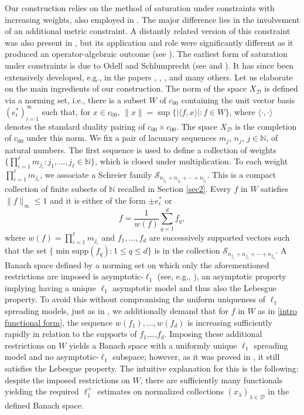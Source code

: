 \documentclass[12pt,a4paper]{amsart}
\newcommand{\N}{\mathbb{N}}
\theoremstyle{definition}
\theoremstyle{plain}
\begin{document}
Our construction relies on the method of saturation under constraints with increasing weights, also employed in \cite{argyros:motakis:2020}. The major difference lies in the involvement of an additional metric constraint. A distantly related version of this constraint was also present in \cite{motakis:2024}, but its application and role were significantly different as it produced an operator-algebraic outcome (see \cite[Section 2]{motakis:2024}). The earliest form of saturation under constraints is due to Odell and Schlumprecht (see \cite{odell:schlumprecht:1995} and \cite{odell:schlumprecht:2000}). It has since been extensively developed, e.g., in the papers \cite{argyros:motakis:2014}, \cite{beanland:freeman:motakis:2015}, \cite{argyros:motakis:2020}, and many others. Let us elaborate on the main ingredients of our construction. The norm of the space $X_\mathcal{D}$ is defined via a norming set, i.e., there is a subset $W$ of $c_{00}$ containing the unit vector basis $(e_i^*)_{i=1}^\infty$ such that, for $x\in c_{00}$, $\|x\| = \sup\{|\langle f,x\rangle|:f\in W\}$, where $\langle\cdot,\cdot\rangle$ denotes the standard duality pairing of $c_{00}\times c_{00}$. The space $X_\mathcal{D}$ is the completion of $c_{00}$ under this norm. We fix a pair of lacunary sequences $m_j$, $n_j$, $j\in\N$, of natural numbers. The first sequence is used to define a collection of weights $\{\prod_{i=1}^\ell m_{j_i}:j_1,\ldots,j_\ell\in\N\}$, which is closed under multiplication. To each weight $\prod_{i=1}^\ell m_{j_i}$, we associate a Schreier family $\mathcal{S}_{n_{j_1}+n_{j_2}+\cdots+n_{j_\ell}}$. This is a compact collection of finite subsets of $\N$ recalled in Section \ref{sec2}. Every $f$ in $W$ satisfies $\|f\|_\infty \leq 1$ and it is either of the form $\pm e_i^*$ or 
\begin{equation}
\label{intro functional form}
f = \frac{1}{w(f)}\sum_{q=1}^d f_q,
\end{equation}
where $w(f) = \prod_{i=1}^\ell m_{j_i}$ and $f_1,\ldots,f_d$ are successively supported vectors such that the set $\{\min\mathrm{supp}(f_q):1\leq q\leq d\}$ is in the collection $\mathcal{S}_{n_{j_1}+n_{j_2}+\cdots+n_{j_d}}$. A Banach space defined by a norming set on which only the aforementioned restrictions are imposed is asymptotic-$\ell_1$ (see, e.g., \cite{argyros:deliyanni:1997}), an asymptotic property implying having a unique $\ell_1$ asymptotic model and thus also the Lebesgue property. To avoid this without compromising the uniform uniqueness of $\ell_1$ spreading models, just as in \cite{argyros:motakis:2020}, we additionally demand that for $f$ in $W$ as in \eqref{intro functional form}, the sequence $w(f_1),\ldots,w(f_d)$ is increasing sufficiently rapidly in relation to the supports of $f_1$,\ldots,$f_d$. Imposing these additional restrictions on $W$ yields a Banach space with a uniformly unique $\ell_1$ spreading model and no asymptotic-$\ell_1$ subspace; however, as it was proved in \cite{gaebler:sari:2023}, it still satisfies the Lebesgue property. The intuitive explanation for this is the following: despite the imposed restrictions on $W$, there are sufficiently many functionals yielding the required $\ell_1^+$ estimates on normalized collections $(x_\lambda)_{\lambda\in\mathcal{D}}$ in the defined Banach space.
\end{document}
